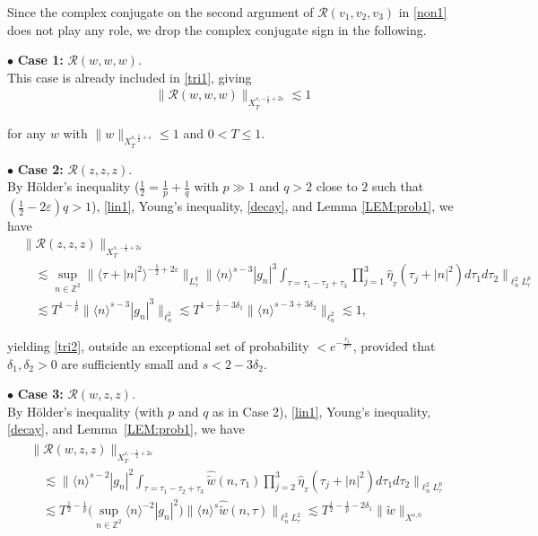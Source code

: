 \documentclass[%
11pt,  reqno]{amsart}
\DeclareMathOperator*{\intt}{\int}
\newcommand{\1}{\hspace{0.2mm}\text{I}\hspace{0.2mm}}
\newcommand{\noi}{\noindent}
\newcommand{\Z}{\mathbb{Z}}
\newcommand{\dl}{\delta}
\newcommand{\eps}{\varepsilon}
\newcommand{\ft}{\widehat}
\newcommand{\wt}{\widetilde}
\newcommand{\ta}{\theta}
\renewcommand{\l}{\ell}
\newcommand{\les}{\lesssim}
\newcommand{\jb}[1]
{\langle #1 \rangle}
\newcommand{\RR}{\mathcal{R}}
\numberwithin{equation}{section}
\numberwithin{theorem}{section}
\begin{document}
\noi
Since 
the complex conjugate on the second argument of $\RR(v_1, v_2, v_3)$
in \eqref{non1}  
does not play any role, we drop the complex conjugate sign 
in the following.



\medskip

\noi 
$\bullet$ {\bf Case 1:} $\RR(w, w, w)$.
\\ \indent
This case is already included in 
\eqref{tri1}, giving
\begin{align*}
\|\RR(w, w, w)\|_{X^{s, -\frac 12 +2 \eps}_T} 
\les 1
\end{align*}

\noi
for any $w$ with $\|w\|_{X^{s, \frac 12 + \eps}_T} \le 1$
and $0 < T \le 1$.



\noi $\bullet$ {\bf Case 2:} 
$\RR(z, z, z)$.
\\ \indent
 By H\"older's inequality  ($\frac{1}{2} =\frac{1}{p} + \frac{1}{q}$
 with $p \gg1$ and $q > 2$ close to $2$ such that $(\frac 12 - 2\eps ) q > 1$), 
 \eqref{lin1}, 
Young's inequality, \eqref{decay}, 
and  Lemma \ref{LEM:prob1}, we have 
\begin{align*}
& \|\RR(z, z, z)\|_{X^{s, -\frac 12 +2 \eps}_T} \\
 & \quad \les \sup_{n \in \Z^2} \|\jb{\tau + |n|^2}^{-\frac{1}{2}+2\eps}\|_{L^{q}_\tau}
\bigg\| \jb{n}^{s-3} |g_n|^3 \intt_{\tau = \tau_1 - \tau_2 + \tau_3} 
\prod_{j = 1}^3 \ft \eta_{_T}(\tau_j + |n|^2) d\tau_1 d\tau_2 \bigg\|_{\l^2_{n} L^p_\tau}\\
& \quad \les
T^{1-\frac 1p} \big\|\jb{n}^{s-3} |g_n |^3 \big\|_{\l^2_n} 
\les T^{1 - \frac 1p-3\dl_1 } \|\jb{n}^{s-3+ 3\dl_2} \|_{\l^2_n} 
\les 1,   
\end{align*}

\noi 
yielding \eqref{tri2}, 
outside an exceptional set of probability $< e^{-\frac{c_1}{T^{c_2}}}$, 
provided that $\dl_1, \dl_2 > 0$
are sufficiently small
and $s < 2 - 3\dl_2$.


\medskip

\noi 
$\bullet$ {\bf Case 3:} 
$\RR(w, z, z)$.
\\ \indent
By H\"older's inequality (with $p$ and $q$ as in Case 2),
 \eqref{lin1}, 
 Young's inequality, \eqref{decay}, and 
Lemma~\ref{LEM:prob1}, we have 
\begin{align}
\begin{split}
& \|\RR(w, z, z)\|_{X^{s, -\frac 12 +2 \eps}_T} \\
& \quad  \les 
\bigg\| \jb{n}^{s-2} |g_n|^2 
\intt_{\tau = \tau_1 - \tau_2 + \tau_3} 
\ft {\wt w}(n, \tau_1)
\prod_{j = 2}^3 \ft \eta_{_T}(\tau_j + |n|^2) d\tau_1 d\tau_2 \bigg\|_{\l^2_{n} L^p_\tau}\\
& \quad \les
T^{\frac{1}{2}-\frac 1p} \Big(\sup_{n\in \Z^2} \jb{n}^{-2} |g_n|^2\Big) \|\jb{n}^{s} \ft{\wt w} (n, \tau) \|_{\l^2_n L^2_\tau} 
\les T^{\frac 12 - \frac 1p - 2\dl_1} \|\wt w \|_{X^{s, 0}}
\end{split}
\label{R2}
\end{align}
\end{document}
